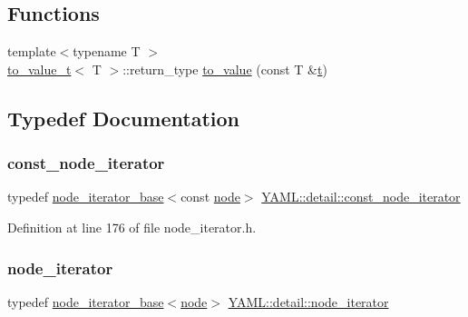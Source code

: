 \subsection*{Functions}
\begin{DoxyCompactItemize}
\item 
{\footnotesize template$<$typename T $>$ }\\\mbox{\hyperlink{struct_y_a_m_l_1_1detail_1_1to__value__t}{to\+\_\+value\+\_\+t}}$<$ T $>$\+::return\+\_\+type \mbox{\hyperlink{namespace_y_a_m_l_1_1detail_a9c6d34b859935b0df4f756b571cb6eab}{to\+\_\+value}} (const T \&\mbox{\hyperlink{glad_8h_aef9f00bf06d58b8db7e501e287488401}{t}})
\end{DoxyCompactItemize}


\subsection{Typedef Documentation}
\mbox{\label{namespace_y_a_m_l_1_1detail_a049af8e269401cbe1e735033914e4356}} 
\subsubsection{\texorpdfstring{const\_node\_iterator}{const\_node\_iterator}}
{\footnotesize\ttfamily typedef \mbox{\hyperlink{class_y_a_m_l_1_1detail_1_1node__iterator__base}{node\+\_\+iterator\+\_\+base}}$<$const \mbox{\hyperlink{class_y_a_m_l_1_1detail_1_1node}{node}}$>$ \mbox{\hyperlink{namespace_y_a_m_l_1_1detail_a049af8e269401cbe1e735033914e4356}{Y\+A\+M\+L\+::detail\+::const\+\_\+node\+\_\+iterator}}}



Definition at line 176 of file node\+\_\+iterator.\+h.

\mbox{\label{namespace_y_a_m_l_1_1detail_aa2a961156810d41a3b6744c10186afac}} 
\subsubsection{\texorpdfstring{node\_iterator}{node\_iterator}}
{\footnotesize\ttfamily typedef \mbox{\hyperlink{class_y_a_m_l_1_1detail_1_1node__iterator__base}{node\+\_\+iterator\+\_\+base}}$<$\mbox{\hyperlink{class_y_a_m_l_1_1detail_1_1node}{node}}$>$ \mbox{\hyperlink{namespace_y_a_m_l_1_1detail_aa2a961156810d41a3b6744c10186afac}{Y\+A\+M\+L\+::detail\+::node\+\_\+iterator}}}



